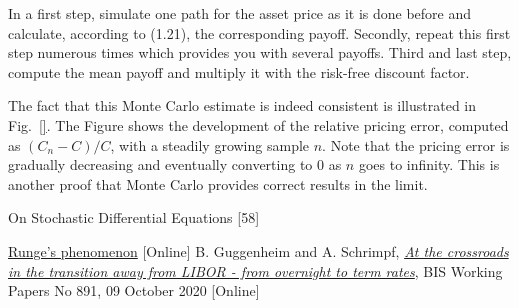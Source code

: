 In a first step, simulate one path for the asset price as it is done 
before and calculate, according to (1.21), the corresponding payoff. 
Secondly, repeat this first step numerous times which provides you with several
payoffs. Third and last step, compute the mean payoff and multiply it
with the risk-free discount factor. 

The fact that this Monte Carlo estimate is indeed consistent is illustrated 
in Fig.~\ref{}. The Figure shows the development of the relative pricing error, 
computed as $(C_n − C)/C$, with a steadily growing sample $n$.
Note that the pricing error is gradually
decreasing and eventually converting to 0 as $n$ goes to infinity. This is
another proof that Monte Carlo provides correct results in the limit.

\begin{thebibliography}{9}
	On Stochastic Differential Equations {[}58{]}
	
	 \href{https://en.wikipedia.org/wiki/Runge\%27s_phenomenon}{Runge's phenomenon} [Online]
	B. Guggenheim and A. Schrimpf, 
	\href{https://www.bis.org/publ/work891.htm}{\emph{At the crossroads in the transition away from LIBOR - from overnight to term rates}}, BIS Working Papers No 891, 09 October 2020 [Online]
\end{thebibliography}









